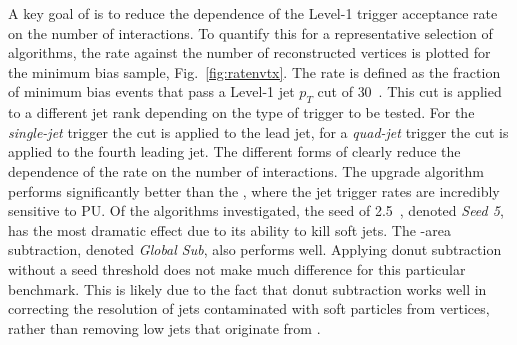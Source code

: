 A key goal of \PUS is to reduce the dependence of the Level-1 trigger
acceptance rate on the number of \PU interactions. To quantify this
for a representative selection of algorithms, the rate against the
number of reconstructed vertices is plotted for the minimum bias sample,
Fig.~\ref{fig:ratenvtx}. The rate is defined as the fraction of
minimum bias events that pass a Level-1 jet $p_T$ cut of $30$~\gev.
This cut is applied to a different jet rank depending on the type of
trigger to be tested. For the \emph{single-jet} trigger the cut is applied to
the lead jet, for a \emph{quad-jet} trigger the cut is applied to the
fourth leading jet. The different forms of \PUS clearly reduce the
dependence of the rate on the number of interactions. The upgrade algorithm
performs significantly better than the \GCT, where the jet trigger
rates are incredibly sensitive to PU. Of the algorithms investigated,
the seed of 2.5~\gev, denoted \emph{Seed 5}, has the most dramatic
effect due to its ability to kill soft \PU jets. The \rho-area
subtraction, denoted \emph{Global Sub}, also performs well. Applying
donut subtraction without a seed threshold does not make much difference for this
particular \PUS benchmark. This is likely due to the fact that
donut subtraction works well in correcting the resolution of jets
contaminated with soft particles from \PU vertices, rather than
removing low \pT jets that originate from \PU.

